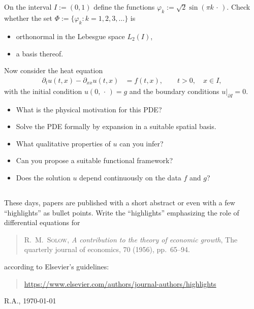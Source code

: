 \documentclass[12pt,a4paper]{article}
\begin{document}
    

    \subsection{}
    
    On the interval $I := (0, 1)$
    define
    the functions
    $
        \varphi_k := \sqrt{2} \sin(\pi k \,\cdot\,)
    $.
    Check whether the set
    $\Phi := \{ \varphi_k : k = 1, 2, 3, \ldots \}$
    is
    \begin{itemize}
    \item
        orthonormal
        in the Lebesgue space $L_2(I)$,
    \item
        a basis thereof.
    \end{itemize}

    Now consider the heat equation
    \begin{align}
        \partial_t u(t, x) - \partial_{x x} u(t, x)
        & =
        f(t, x),
        \qquad
        t > 0,
        \quad
        x \in I
        ,
    \end{align}
    with the initial condition $u(0, \,\cdot\,) = g$
    and the boundary conditions $u|_{\partial I} = 0$.
    
    \begin{itemize}
    \item
        What is the physical motivation for this PDE?
    \item
        Solve the PDE formally by expansion in a suitable spatial basis.
    \item
        What qualitative properties of $u$ can you infer?
    \item
        Can you propose a suitable functional framework?
    \item
        Does the solution $u$ depend continuously 
        on the data $f$ and $g$?
    \end{itemize}

    
    \subsection{}
    
    These days, papers are published with a short abstract
    or even with a few ``highlights'' as bullet points. 
    Write the ``highlights''
    emphasizing the role of differential equations for 
    \begin{quote}
        \textsc{R.~M.~Solow},
        \emph{A contribution to the theory of economic growth},
        The quarterly journal of economics, 70 (1956), pp.~65--94.
    \end{quote}
    according to Elsevier's guidelines: 
    \begin{quote}
        {\small\url{https://www.elsevier.com/authors/journal-authors/highlights}}
    \end{quote}
    
    


    \vfill\hfill R.A., \today
\end{document}
